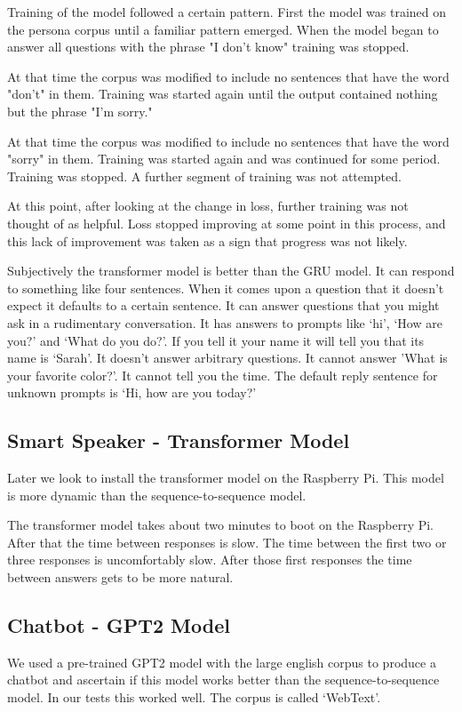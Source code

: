 Training of the model followed a certain pattern. First the model was trained on the persona corpus until a familiar pattern emerged. When the model began to answer all questions with the 
phrase "I don't know" training was stopped. 

At that time the corpus was modified to include no 
sentences that have the word "don't" in them. Training was started again until the output contained nothing but the phrase "I'm sorry." 

At that time the corpus was modified to include no sentences that have the word "sorry" in them.
Training was started again and was continued for some period. Training was stopped. A further segment of training was not attempted. 

At this point, after looking at the change in loss, further training was not
thought of as helpful. Loss stopped improving at some point in this process, and this lack of
improvement was taken as a sign that progress was not likely.

Subjectively the transformer model is better than the GRU model. It can respond to something like
four sentences. When it comes upon a question that it doesn't expect it defaults to a certain sentence. It can answer questions that you might ask in a rudimentary conversation. It has answers to prompts like `hi', `How are you?' and `What do you do?'. If you tell it your name it will tell you that its name is `Sarah'. It doesn't answer arbitrary questions. It cannot answer 'What is your favorite color?'. It cannot tell you the time. The default reply sentence for unknown prompts is `Hi, how are you today?'

\subsection{Smart Speaker - Transformer Model}

Later we look to install the transformer model on the Raspberry Pi. This model is more dynamic than the sequence-to-sequence model. 

The transformer model takes about two minutes to boot on the Raspberry Pi. After that the time between responses is slow. The time between the first two or three responses is uncomfortably slow. After those first responses the time between answers gets to be more natural.



\subsection{Chatbot - GPT2 Model}
We used a pre-trained GPT2 model with the large english corpus to produce a chatbot and ascertain if this model works better than the sequence-to-sequence model. In our tests this worked well. The corpus is called `WebText'.

